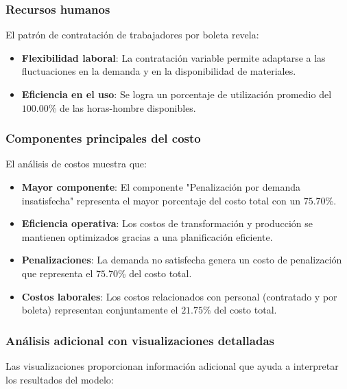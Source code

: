 \subsubsection*{Recursos humanos}

El patrón de contratación de trabajadores por boleta revela:

\begin{itemize}
    \item \textbf{Flexibilidad laboral}: La contratación variable permite adaptarse a las fluctuaciones en la demanda y en la disponibilidad de materiales.
    \item \textbf{Eficiencia en el uso}: Se logra un porcentaje de utilización promedio del $100.00$\% de las horas-hombre disponibles.
\end{itemize}

\subsubsection*{Componentes principales del costo}

El análisis de costos muestra que:

\begin{itemize}
    \item \textbf{Mayor componente}: El componente "Penalización por demanda insatisfecha" representa el mayor porcentaje del costo total con un $75.70$\%.
    \item \textbf{Eficiencia operativa}: Los costos de transformación y producción se mantienen optimizados gracias a una planificación eficiente.
    \item \textbf{Penalizaciones}: La demanda no satisfecha genera un costo de penalización que representa el $75.70$\% del costo total.
    \item \textbf{Costos laborales}: Los costos relacionados con personal (contratado y por boleta) representan conjuntamente el $21.75$\% del costo total.
\end{itemize}

\subsubsection*{Análisis adicional con visualizaciones detalladas}

Las visualizaciones proporcionan información adicional que ayuda a interpretar los resultados del modelo:

